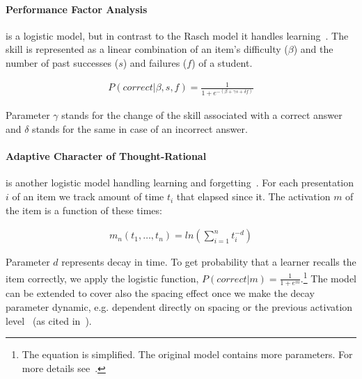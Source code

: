 \documentclass[table,color,cover,twoside,nolot,nolof]{fithesis3/fithesis3}
\begin{document}
\paragraph*{Performance Factor Analysis} is a logistic model, but in contrast
to the Rasch model it handles learning~\cite{pavlik2009performance}. The
skill is represented as a linear combination of an item's difficulty ($\beta$)
and the number of past successes ($s$) and failures ($f$) of a student.

\begin{align}
P(correct|\beta,s, f) = \frac{1}{1 + e^{-(\beta + \gamma s + \delta f)}}
\end{align}

Parameter $\gamma$ stands for the change of the skill associated with a correct
answer and $\delta$ stands for the same in case of an incorrect answer.

\paragraph*{Adaptive Character of Thought-Rational} is another logistic model
handling learning and forgetting~\cite{pavlik2005practice}. For each
presentation $i$ of an item we track amount of time $t_i$ that elapsed since
it. The activation $m$ of the item is a function of these times:

\begin{align}
m_n(t_1, \ldots, t_n) = ln\left(\sum_{i=1}^n t_i^{-d}\right)
\end{align}

Parameter $d$ represents decay in time. To get probability that a learner recalls
the item correctly, we apply the logistic function, $P(correct|m) = \frac{1}{1
+ e^{m}}$.\footnote{The equation is simplified. The original model contains more parameters. For more details see~\cite{pavlik2005practice}.} The model can be extended to cover also the spacing
effect once we make the decay parameter dynamic, e.g. dependent directly on
spacing or the previous activation level~\cite{anderson1991reflections} (as
cited in~\cite{pavlik2005practice}).

\bigskip
\end{document}

